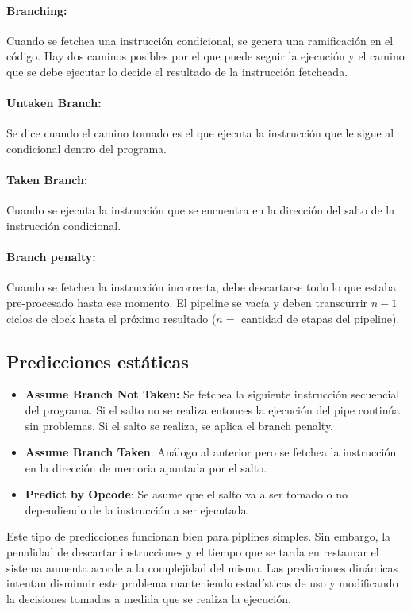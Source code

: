 \paragraph{Branching:} Cuando se fetchea una instrucción condicional, se genera una ramificación en el código. Hay dos caminos posibles por el que puede seguir la ejecución y el camino que se debe ejecutar lo decide el resultado de la instrucción fetcheada. 

\paragraph{Untaken Branch:} Se dice cuando el camino tomado es el que ejecuta la instrucción que le sigue al condicional dentro del programa.

\paragraph{Taken Branch:} Cuando se ejecuta la instrucción que se encuentra en la dirección del salto de la instrucción condicional.

\paragraph{Branch penalty:} Cuando se fetchea la instrucción incorrecta, debe descartarse todo lo que estaba pre-procesado hasta ese momento. El pipeline se vacía y deben transcurrir $n-1$ ciclos de clock hasta el próximo resultado ($n = $ cantidad de etapas del pipeline).

\subsection{Predicciones estáticas}
\begin{itemize}
	\item \textbf{Assume Branch Not Taken:}  Se fetchea la siguiente instrucción secuencial del programa. Si el salto no se realiza entonces la ejecución del pipe continúa sin problemas. Si el salto se realiza, se aplica el branch penalty.
	\item \textbf{Assume Branch Taken}: Análogo al anterior pero se fetchea la instrucción en la dirección de memoria apuntada por el salto.
	\item \textbf{Predict by Opcode}: Se asume que el salto va a ser tomado o no dependiendo de la instrucción a ser ejecutada.
\end{itemize}

Este tipo de predicciones funcionan bien para piplines simples. Sin embargo, la penalidad de descartar instrucciones y el tiempo que se tarda en restaurar el sistema aumenta acorde a la complejidad del mismo. Las predicciones dinámicas intentan disminuir este problema manteniendo estadísticas de uso y modificando la decisiones tomadas a medida que se realiza la ejecución.

